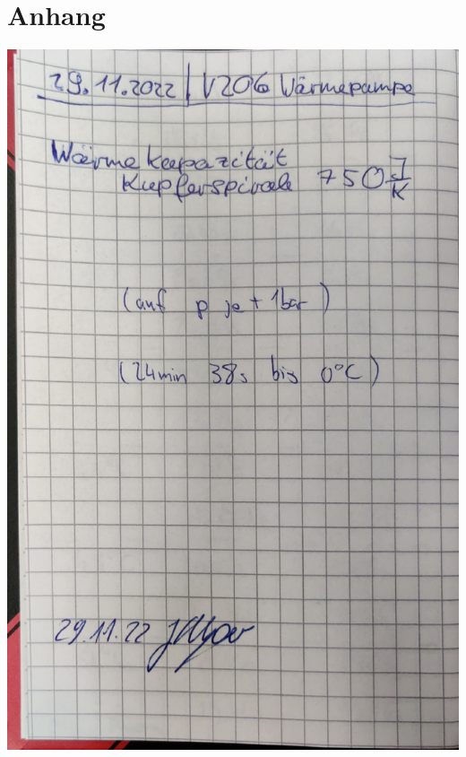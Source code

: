 \section{Anhang}
\begin{minipage}[t]{0.45\textwidth}
    \includegraphics[width=\textwidth, page=1]{v206 Messdaten.pdf}
\end{minipage}
